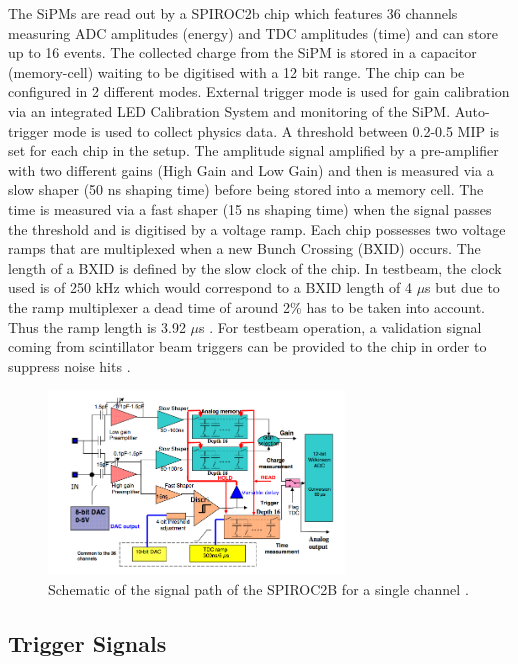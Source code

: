 \documentclass[twoside,a4paper,11pt]{article}
\begin{document}
The SiPMs are read out by a SPIROC2b chip which features 36 channels measuring ADC amplitudes (energy) and TDC amplitudes (time) and can store up to 16 events. The collected charge from the SiPM is stored in a capacitor (memory-cell) waiting to be digitised with a 12 bit range. The chip can be configured in 2 different modes. External trigger mode is used for gain calibration via an integrated LED Calibration System and monitoring of the SiPM. Auto-trigger mode is used to collect physics data. A threshold between 0.2-0.5 MIP is set for each chip in the setup. The amplitude signal amplified by a pre-amplifier with two different gains (High Gain and Low Gain) and then is measured via a slow shaper (50 ns shaping time) before being stored into a memory cell. The time is measured via a fast shaper (15 ns shaping time) when the signal passes the threshold and is digitised by a voltage ramp. Each chip possesses two voltage ramps that are multiplexed when a new Bunch Crossing (BXID) occurs. The length of a BXID is defined by the slow clock of the chip. In testbeam, the clock used is of 250 kHz which would correspond to a BXID length of 4 $\mu$s but due to the ramp multiplexer a dead time of around 2\% has to be taken into account. Thus the ramp length is 3.92 $\mu$s \cite{EldwanSSP}. For testbeam operation, a validation signal coming from scintillator beam triggers can be provided to the chip in order to suppress noise hits \cite{DAQ}.\\
\begin{figure}[htbp]
\begin{center}
\includegraphics[width=0.7\textwidth]{fig/Others/Spiroc_layout.png}
\caption{Schematic of the signal path of the SPIROC2B for a single channel \cite{SPIROCManual}.}
\label{fig:SPIROC2B}
\end{center}
\end{figure}

\subsection{Trigger Signals}
\label{subsec:trigger}
\end{document}
